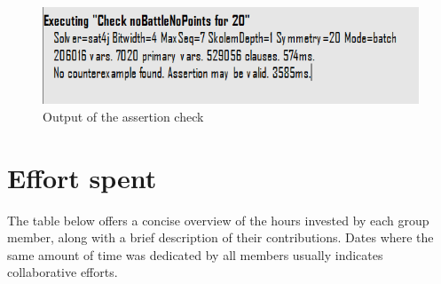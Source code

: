 \documentclass[12pt, a4paper]{report}
\begin{document}
\begin{figure}[H]
    \centering
    \includegraphics[width=0.5\linewidth]{images/marta.png}
    \caption{Output of the assertion check}
\end{figure}

\chapter{Effort spent}
    The table below offers a concise overview of the hours invested by each group member, along with a brief description of their contributions. 
    Dates where the same amount of time was dedicated by all members usually indicates collaborative efforts.
\end{document}

